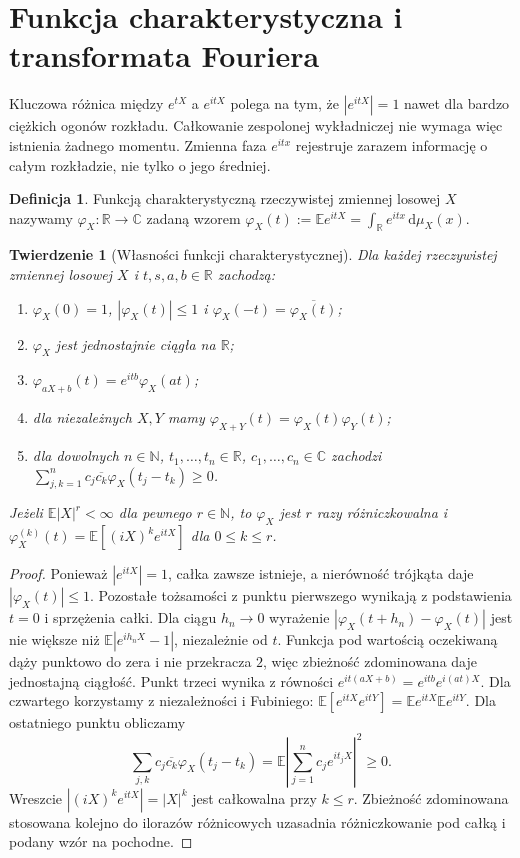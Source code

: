 \documentclass[11pt,a4paper,oneside]{report}
\numberwithin{equation}{chapter}
\theoremstyle{plain}
\newtheorem{twierdzenie}{Twierdzenie}[chapter]
\theoremstyle{definition}
\newtheorem{definicja}{Definicja}[chapter]
\theoremstyle{remark}
\newcommand{\R}{\mathbb{R}}
\newcommand{\N}{\mathbb{N}}
\newcommand{\E}{\mathbb{E}}
\newcommand{\dd}{\mathrm{d}}
\begin{document}
\section{Funkcja charakterystyczna i transformata Fouriera}

Kluczowa różnica między $e^{tX}$ a $e^{itX}$ polega na tym,
że $|e^{itX}|=1$ nawet dla bardzo ciężkich ogonów rozkładu.
Całkowanie zespolonej wykładniczej nie wymaga więc istnienia
żadnego momentu. Zmienna faza $e^{itx}$ rejestruje zarazem
informację o całym rozkładzie, nie tylko o jego średniej.

\begin{definicja}
Funkcją charakterystyczną rzeczywistej zmiennej losowej $X$
nazywamy $\varphi_X:\R\to\mathbb C$ zadaną wzorem
$\varphi_X(t):=\E e^{itX}=\int_\R e^{itx}\,\dd\mu_X(x)$.
\end{definicja}

\begin{twierdzenie}[Własności funkcji charakterystycznej]
Dla każdej rzeczywistej zmiennej losowej $X$ i
$t,s,a,b\in\R$ zachodzą:
\begin{enumerate}
\item $\varphi_X(0)=1$, $|\varphi_X(t)|\leq1$
 i $\varphi_X(-t)=\overline{\varphi_X(t)}$;
\item $\varphi_X$ jest jednostajnie ciągła na $\R$;
\item $\varphi_{aX+b}(t)=e^{itb}\varphi_X(at)$;
\item dla niezależnych $X,Y$ mamy
 $\varphi_{X+Y}(t)=\varphi_X(t)\varphi_Y(t)$;
\item dla dowolnych $n\in\N$, $t_1,\ldots,t_n\in\R$,
 $c_1,\ldots,c_n\in\mathbb C$ zachodzi
 $\sum_{j,k=1}^n c_j\overline{c_k}\varphi_X(t_j-t_k)\geq0$.
\end{enumerate}
Jeżeli $\E|X|^r<\infty$ dla pewnego $r\in\N$,
to $\varphi_X$ jest $r$ razy różniczkowalna i
$\varphi_X^{(k)}(t)=\E[(iX)^k e^{itX}]$
dla $0\leq k\leq r$.
\end{twierdzenie}
\begin{proof}
Ponieważ $|e^{itX}|=1$, całka zawsze istnieje,
a nierówność trójkąta daje $|\varphi_X(t)|\leq1$.
Pozostałe tożsamości z punktu pierwszego wynikają
z podstawienia $t=0$ i sprzężenia całki.
Dla ciągu $h_n\to0$ wyrażenie
$|\varphi_X(t+h_n)-\varphi_X(t)|$
jest nie większe niż $\E|e^{ih_nX}-1|$, niezależnie od $t$.
Funkcja pod wartością oczekiwaną dąży punktowo do zera
i nie przekracza $2$, więc zbieżność zdominowana daje
jednostajną ciągłość. Punkt trzeci wynika z równości
$e^{it(aX+b)}=e^{itb}e^{i(at)X}$.
Dla czwartego korzystamy z niezależności i Fubiniego:
$\E[e^{itX}e^{itY}]=\E e^{itX}\E e^{itY}$.
Dla ostatniego punktu obliczamy
\[
\sum_{j,k}c_j\overline{c_k}\varphi_X(t_j-t_k)
=\E\left|\sum_{j=1}^n c_je^{it_jX}\right|^2\geq0.
\]
Wreszcie $|(iX)^k e^{itX}|=|X|^k$ jest całkowalna
przy $k\leq r$. Zbieżność zdominowana stosowana
kolejno do ilorazów różnicowych uzasadnia różniczkowanie
pod całką i podany wzór na pochodne.
\end{proof}
\end{document}

